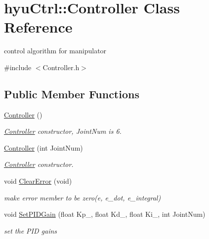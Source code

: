 \hypertarget{classhyu_ctrl_1_1_controller}{}\section{hyu\+Ctrl\+:\+:Controller Class Reference}
\label{classhyu_ctrl_1_1_controller}


control algorithm for manipulator  




{\ttfamily \#include $<$Controller.\+h$>$}

\subsection*{Public Member Functions}
\begin{DoxyCompactItemize}
\item 
\mbox{\label{classhyu_ctrl_1_1_controller_a90919718c7aeab435cb6808726c75fba}} 
\hyperlink{classhyu_ctrl_1_1_controller_a90919718c7aeab435cb6808726c75fba}{Controller} ()
\begin{DoxyCompactList}\small\item\em \hyperlink{classhyu_ctrl_1_1_controller}{Controller} constructor, Joint\+Num is 6. \end{DoxyCompactList}\item 
\hyperlink{classhyu_ctrl_1_1_controller_aa3ac4e6fe270eadd7892f2c6da4f57dc}{Controller} (int Joint\+Num)
\begin{DoxyCompactList}\small\item\em \hyperlink{classhyu_ctrl_1_1_controller}{Controller} constructor. \end{DoxyCompactList}\item 
\mbox{\label{classhyu_ctrl_1_1_controller_a44b7e4046d6d12fe1ac779bf97a9f765}} 
void \hyperlink{classhyu_ctrl_1_1_controller_a44b7e4046d6d12fe1ac779bf97a9f765}{Clear\+Error} (void)
\begin{DoxyCompactList}\small\item\em make error member to be zero(e, e\+\_\+dot, e\+\_\+integral) \end{DoxyCompactList}\item 
void \hyperlink{classhyu_ctrl_1_1_controller_a3aa87a75981a8f708425210b30a20eb4}{Set\+P\+I\+D\+Gain} (float Kp\+\_\+, float Kd\+\_\+, float Ki\+\_\+, int Joint\+Num)
\begin{DoxyCompactList}\small\item\em set the P\+ID gains \end{DoxyCompactList}\item 

\end{DoxyCompactItemize}
